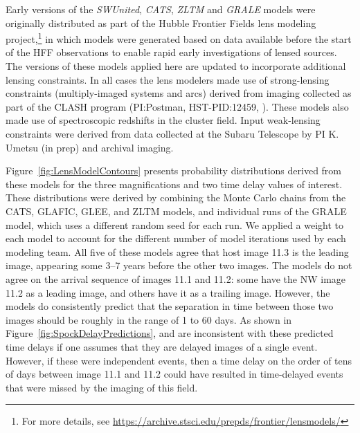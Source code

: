 Early versions of the {\it SWUnited}, {\it CATS}, {\it ZLTM} and {\it
  GRALE} models were originally distributed as part of the Hubble
Frontier Fields lens modeling project,\footnote{For more details, see
  \url{https://archive.stsci.edu/prepds/frontier/lensmodels/}} in
which models were generated based on data available before the start
of the HFF observations to enable rapid early investigations of lensed
sources. The versions of these models applied here are updated to
incorporate additional lensing constraints.  In all cases the lens
modelers made use of strong-lensing constraints (multiply-imaged
systems and arcs) derived from \HST imaging collected as part of the
CLASH program (PI:Postman, HST-PID:12459,
\citealt{Postman:2012}). These models also made use of spectroscopic
redshifts in the cluster field\cite{Mann:2012, Christensen:2012,
  Grillo:2015, Caminha:2017}.  Input weak-lensing constraints were
derived from data collected at the Subaru Telescope by PI K. Umetsu
(in prep) and archival imaging.


Figure~\ref{fig:LensModelContours} presents probability distributions
derived from these models for the three magnifications and two time
delay values of interest.  These distributions were derived by
combining the Monte Carlo chains from the CATS, GLAFIC, GLEE, and ZLTM
models, and individual runs of the GRALE model, which uses a different
random seed for each run.  We applied a weight to each model to
account for the different number of model iterations used by each
modeling team. All five of these models agree that host image 11.3 is
the leading image, appearing some 3--7 years before the other two
images.  The models do not agree on the arrival sequence of images
11.1 and 11.2: some have the NW image 11.2 as a leading image, and
others have it as a trailing image.  However, the models do
consistently predict that the separation in time between those two
images should be roughly in the range of 1 to 60 days. As shown in
Figure~\ref{fig:SpockDelayPredictions}, \spockone and \spocktwo are
inconsistent with these predicted time delays if one assumes that they
are delayed images of a single event.  However, if these were
independent events, then a time delay on the order of tens of days
between image 11.1 and 11.2 could have resulted in time-delayed events
that were missed by the \HST imaging of this field.

